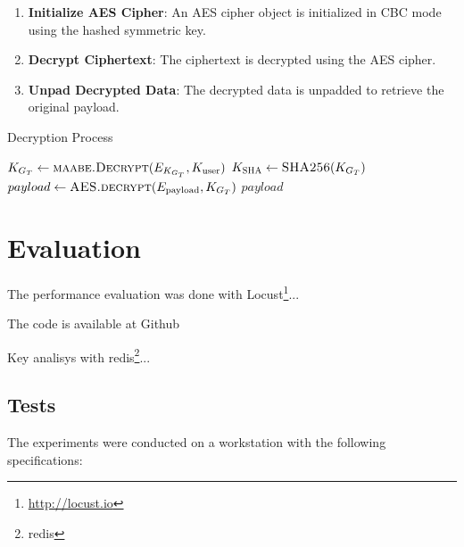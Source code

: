 \documentclass[cic,tc,english]{iiufrgs}
\begin{document}
                \begin{enumerate}
                    \item \textbf{Initialize AES Cipher}: An AES cipher object is initialized in CBC mode using the hashed symmetric key.
                    \item \textbf{Decrypt Ciphertext}: The ciphertext is decrypted using the AES cipher.
                    \item \textbf{Unpad Decrypted Data}: The decrypted data is unpadded to retrieve the original payload.
                \end{enumerate}

                \begin{algorithm}
                    \caption{Decryption Process}
                    \label{alg:decryption_process}
                    \scriptsize
                    \begin{algorithmic}[1]
                        \State $K_{G_T} \gets \textsc{maabe.Decrypt}(E_{K_{G_T}}, K_{\text{user}})$
                        \State $K_{\textsc{SHA}} \gets \textsc{SHA256}(K_{G_T})$
                        \State $payload \gets \textsc{AES.decrypt}(E_{\text{payload}}, K_{G_T})$
                        \State \Return $payload$
                    \EndProcedure
                    \end{algorithmic}
                \end{algorithm}


\chapter{Evaluation}
    \label{chap:evaluation}
    The performance evaluation was done with Locust\footnote{\url{http://locust.io}}...

    The code is available at Github\citet{maabeflask}
    
    Key analisys with redis\footnote{redis}...

    \section{Tests}
        \label{sec:tests}

        The experiments were conducted on a workstation with the following specifications:
\end{document}
